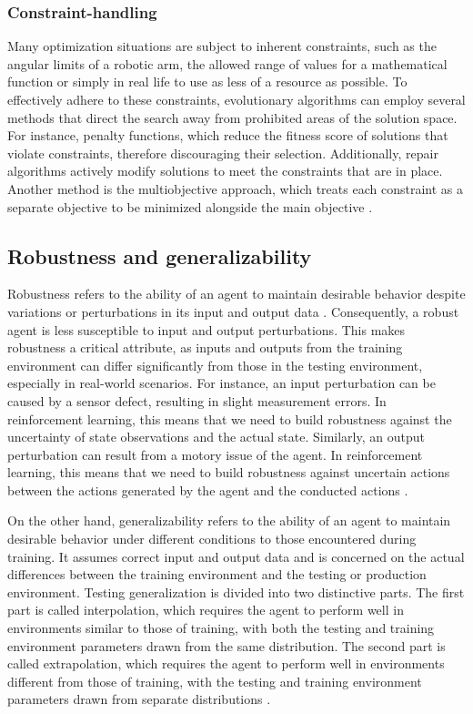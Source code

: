     \subsubsection{Constraint-handling}
        Many optimization situations are subject to inherent constraints, such as the angular limits of a robotic arm, the allowed range of values for a mathematical function or simply in real life to use as less of a resource as possible. To effectively adhere to these constraints, evolutionary algorithms can employ several methods that direct the search away from prohibited areas of the solution space. For instance, penalty functions, which reduce the fitness score of solutions that violate constraints, therefore discouraging their selection. Additionally, repair algorithms actively modify solutions to meet the constraints that are in place. Another method is the multiobjective approach, which treats each constraint as a separate objective to be minimized alongside the main objective \cite{Kramer_2010}.



\subsection{Robustness and generalizability}
    Robustness refers to the ability of an agent to maintain desirable behavior despite variations or perturbations in its input and output data \cite{Ravi_Mangal_2019, Charles_Packer_2019, Xu_Mengdi_2022}. Consequently, a robust agent is less susceptible to input and output perturbations. This makes robustness a critical attribute, as inputs and outputs from the training environment can differ significantly from those in the testing environment, especially in real-world scenarios. For instance, an input perturbation can be caused by a sensor defect, resulting in slight measurement errors. In reinforcement learning, this means that we need to build robustness against the uncertainty of state observations and the actual state. Similarly, an output perturbation can result from a motory issue of the agent. In reinforcement learning, this means that we need to build robustness against uncertain actions between the actions generated by the agent and the conducted actions \cite{Xu_Mengdi_2022}. 

    On the other hand, generalizability refers to the ability of an agent to maintain desirable behavior under different conditions to those encountered during training. It assumes correct input and output data and is concerned on the actual differences between the training environment and the testing or production environment. Testing generalization is divided into two distinctive parts. The first part is called interpolation, which requires the agent to perform well in environments similar to those of training, with both the testing and training environment parameters drawn from the same distribution. The second part is called extrapolation, which requires the agent to perform well in environments different from those of training, with the testing and training environment parameters drawn from separate distributions \cite{Charles_Packer_2019, Xu_Mengdi_2022}.


